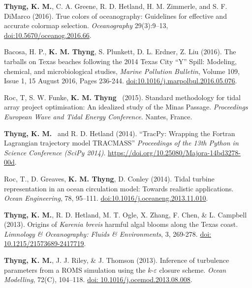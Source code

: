 \documentclass[10pt,letterpaper]{article}
\newcommand{\kmt}{\textbf{K. M. Thyng}}
\newcommand{\tkm}{\textbf{Thyng, K. M.}}
\renewenvironment{itemize}{
  \begin{list}{}{
    \setlength{\leftmargin}{1.5em}
    \setlength{\itemsep}{0.25em}
    \setlength{\parskip}{0pt}
    \setlength{\parsep}{0.25em}
  }
}{
  \end{list}
}
\begin{document}
\begin{itemize}
\item \tkm, C. A. Greene, R. D. Hetland, H. M. Zimmerle, and S. F. DiMarco (2016). True colors of oceanography: Guidelines for effective and accurate colormap selection. \textit{Oceanography} 29(3):9--13,\\ \href{http://tos.org/oceanography/assets/docs/29-3_thyng.pdf}{doi:10.5670/oceanog.2016.66}.

\item Bacosa, H. P., \kmt, S. Plunkett, D. L. Erdner, Z. Liu (2016). The tarballs on Texas beaches following the 2014 Texas City ``Y'' Spill: Modeling, chemical, and microbiological studies, \textit{Marine Pollution Bulletin}, Volume 109, Issue 1, 15 August 2016, Pages 236-244. \href{http://www.sciencedirect.com/science/article/pii/S0025326X16303964}{doi:10.1016/j.marpolbul.2016.05.076}.

\item Roc, T, S. W. Funke, \kmt~ (2015). Standard methodology for tidal array project optimisation: An idealized study of the Minas Passage. \textit{Proceedings European Wave and Tidal Energy Conference}. Nantes, France.

\item \tkm~ and R. D. Hetland (2014). ``TracPy: Wrapping the Fortran Lagrangian trajectory model TRACMASS'' \textit{Proceedings of the 13th Python in Science Conference (SciPy 2014)}. \href{http://conference.scipy.org/proceedings/scipy2014/pdfs/thyng.pdf}{\url{https://doi.org/10.25080/Majora-14bd3278-00d}}.

\item Roc, T., D. Greaves, \kmt, D. Conley (2014). Tidal turbine representation in an ocean circulation model: Towards realistic applications. \textit{Ocean Engineering}, 78, 95--111. \href{http://dx.doi.org/10.1016/j.oceaneng.2013.11.010}{doi:10.1016/j.oceaneng.2013.11.010}.

\item \tkm, R. D. Hetland, M. T. Ogle, X. Zhang, F. Chen, \& L. Campbell (2013). Origins of \textit{Karenia brevis} harmful algal blooms along the Texas coast. \textit{Limnology \& Oceanography: Fluids \& Environments}, 3, 269-278. \href{http://lofe.dukejournals.org/content/3/269.full}{doi: 10.1215/21573689-2417719}.

\item \tkm, J. J. Riley, \& J. Thomson (2013). Inference of turbulence parameters from a ROMS simulation using the $k$-$\varepsilon$ closure scheme. \textit{Ocean Modelling}, 72(C), 104--118. \href{http://www.sciencedirect.com/science/article/pii/S1463500313001613}{doi: 10.1016/j.ocemod.2013.08.008}.


\end{itemize}
\end{document}
